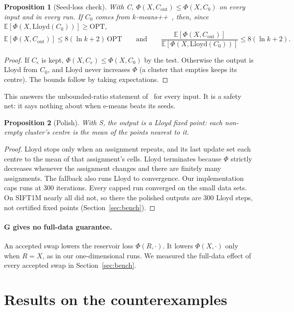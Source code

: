 \documentclass[11pt]{article}
\newtheorem{proposition}{Proposition}
\theoremstyle{remark}
\newcommand{\E}{\mathbb{E}}
\newcommand{\OPT}{\mathrm{OPT}}
\begin{document}
\begin{proposition}[Seed-loss check]\label{prop:check}
With C, $\Phi(X,C_{\mathrm{out}})\le\Phi(X,C_0)$ on every input and in every run.
If $C_0$ comes from $k$-means++~\cite{arthur2007}, then, since
$\E[\Phi(X,\mathrm{Lloyd}(C_0))]\ge\OPT$,
\[
\E[\Phi(X,C_{\mathrm{out}})]\le 8(\ln k+2)\,\OPT
\qquad\text{and}\qquad
\frac{\E[\Phi(X,C_{\mathrm{out}})]}{\E[\Phi(X,\mathrm{Lloyd}(C_0))]}\le 8(\ln k+2).
\]
\end{proposition}
\begin{proof}
If $C_e$ is kept, $\Phi(X,C_e)\le\Phi(X,C_0)$ by the test. Otherwise the output is Lloyd from
$C_0$, and Lloyd never increases $\Phi$ (a cluster that empties keeps its centre). The bounds
follow by taking expectations.
\end{proof}

This answers the unbounded-ratio statement of~\cite{assylbekov2026} for every input. It is a
safety net: it says nothing about when e-means beats its seeds.

\begin{proposition}[Polish]\label{prop:polish}
With S, the output is a Lloyd fixed point: each non-empty cluster's centre is the mean of the
points nearest to it.
\end{proposition}
\begin{proof}
Lloyd stops only when an assignment repeats, and its last update set each centre to the mean of
that assignment's cells. Lloyd terminates because $\Phi$ strictly decreases whenever the
assignment changes and there are finitely many assignments. The fallback also runs Lloyd to
convergence. Our implementation caps runs at 300 iterations. Every capped run converged on the
small data sets. On SIFT1M nearly all did not, so there the polished outputs are 300 Lloyd steps,
not certified fixed points (Section~\ref{sec:bench}).
\end{proof}

\paragraph{G gives no full-data guarantee.} An accepted swap lowers the reservoir loss
$\Phi(R,\cdot)$. It lowers $\Phi(X,\cdot)$ only when $R=X$, as in our one-dimensional runs. We
measured the full-data effect of every accepted swap in Section~\ref{sec:bench}.

\section{Results on the counterexamples}
\end{document}

